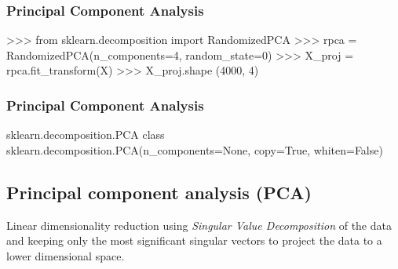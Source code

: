 \begin{frame}[fragile]
	\frametitle{Principal Component Analysis}
>>> from sklearn.decomposition import RandomizedPCA
>>> rpca = RandomizedPCA(n_components=4, random_state=0)
>>> X_proj = rpca.fit_transform(X)
>>> X_proj.shape
(4000, 4)
\end{frame}
\begin{frame}[fragile]
	\frametitle{Principal Component Analysis}

sklearn.decomposition.PCA
class sklearn.decomposition.PCA(n_components=None, copy=True, whiten=False)
\subsection*{Principal component analysis (PCA)}

Linear dimensionality reduction using \textit{Singular Value Decomposition} of the data and keeping only the most significant singular vectors to project the data to a lower dimensional space.
\end{frame}
